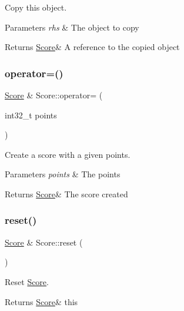 Copy this object. 


\begin{DoxyParams}{Parameters}
{\em rhs} & The object to copy \\
\hline
\end{DoxyParams}
\begin{DoxyReturn}{Returns}
\hyperlink{class_score}{Score}\& A reference to the copied object 
\end{DoxyReturn}
\mbox{\label{class_score_ade5285f719702dec177b23568a6f79e3}} 
\subsubsection{\texorpdfstring{operator=()}{operator=()}\hspace{0.1cm}{\footnotesize\ttfamily [2/2]}}
{\footnotesize\ttfamily \hyperlink{class_score}{Score} \& Score\+::operator= (\begin{DoxyParamCaption}\item[{int32\+\_\+t}]{points }\end{DoxyParamCaption})}



Create a score with a given points. 


\begin{DoxyParams}{Parameters}
{\em points} & The points \\
\hline
\end{DoxyParams}
\begin{DoxyReturn}{Returns}
\hyperlink{class_score}{Score}\& The score created 
\end{DoxyReturn}
\mbox{\label{class_score_a8ee59cdc6c44f0ad80feb01219d3357d}} 
\subsubsection{\texorpdfstring{reset()}{reset()}}
{\footnotesize\ttfamily \hyperlink{class_score}{Score} \& Score\+::reset (\begin{DoxyParamCaption}{ }\end{DoxyParamCaption})}



Reset \hyperlink{class_score}{Score}. 

\begin{DoxyReturn}{Returns}
\hyperlink{class_score}{Score}\& this 
\end{DoxyReturn}
\mbox{\label{class_score_a6b5ea89d47e54eb743c7a7795719e171}} 
